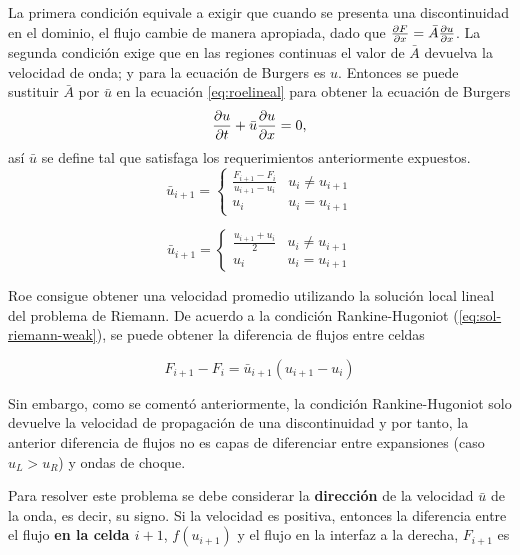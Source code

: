 \documentclass[12pt]{article}
\begin{document}
	La primera condición equivale a exigir que cuando se presenta una discontinuidad en el dominio, el flujo cambie de manera apropiada, dado que $\pdv{F}{x} = \bar{A} \pdv{u}{x}$. La segunda condición exige que en las regiones continuas el valor de $\bar{A}$ devuelva la velocidad de onda; y para la ecuación de Burgers es $u$. Entonces se puede sustituir $\bar{A}$ por $\bar{u}$ en la ecuación \ref{eq:roelineal} para obtener la ecuación de Burgers
	\begin{equation}
		\pdv{u}{t} + \bar{u} \pdv{u}{x} = 0,
	\end{equation}
	así $\bar{u}$ se define tal que satisfaga los requerimientos anteriormente expuestos.
	\begin{equation}
		\bar{u}_{i+1} =
		\begin{cases}
			\frac{F_{i+1} - F_{i}}{u_{i+1} - u_{i}} & u_{i} \neq u_{i+1}\\
			u_{i} & u_{i} = u_{i+1} 
		\end{cases}
	\end{equation}
	
	\begin{equation}
		\bar{u}_{i+1} =
		\begin{cases}
			\frac{u_{i+1} + u_{i}}{2} & u_{i} \neq u_{i+1}\\
			u_{i} & u_{i} = u_{i+1} 
		\end{cases}
	\label{eq:u-prom}
	\end{equation}
	
	Roe consigue obtener una velocidad promedio utilizando la solución local lineal del problema de Riemann. De acuerdo a la condición Rankine-Hugoniot (\ref{eq:sol-riemann-weak}), se puede obtener la diferencia de flujos entre celdas \cite{pletcher1997computational}
	
	\begin{equation}
		F_{i+1} - F_{i} = \bar{u}_{i+1}\left(u_{i+1}-u_{i} \right) 
	\end{equation}

	Sin embargo, como se comentó anteriormente, la condición Rankine-Hugoniot solo devuelve la velocidad de propagación de una discontinuidad y por tanto, la anterior diferencia de flujos no es capas de diferenciar entre expansiones (caso $u_L > u_R$) y ondas de choque.
	
	Para resolver este problema se debe considerar la \textbf{dirección} de la velocidad $\bar{u}$ de la onda, es decir, su signo. Si la velocidad es positiva, entonces la diferencia entre el flujo \textbf{en la celda $i+1$}, $f(u_{i+1})$ y el flujo en la interfaz a la derecha, $F_{i+1}$ es
	
\end{document}
